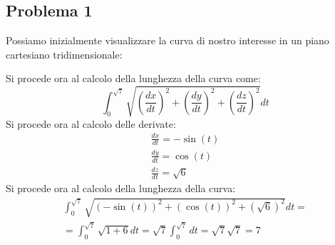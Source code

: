 
\subsection{Problema 1}
Possiamo inizialmente visualizzare la curva di nostro interesse in un piano cartesiano tridimensionale:
\begin{center}

\end{center}

\noindent Si procede ora al calcolo della lunghezza della curva come:
\begin{equation}
    \int_{0}^{\sqrt{7}} \sqrt{\left(\frac{dx}{dt}\right)^2 + \left(\frac{dy}{dt}\right)^2 + \left(\frac{dz}{dt}\right)^2} dt
\end{equation}
Si procede ora al calcolo delle derivate:
\begin{equation}
    \begin{split}
        \frac{dx}{dt} = -\sin(t) \\
        \frac{dy}{dt} = \cos(t)  \\
        \frac{dz}{dt} = \sqrt{6}
    \end{split}
\end{equation}
Si procede ora al calcolo della lunghezza della curva:
\begin{equation}
    \begin{split}
        \int_{0}^{\sqrt{7}} \sqrt{(-\sin(t))^2 + (\cos(t))^2 + (\sqrt{6})^2} dt = \\
        = \int_{0}^{\sqrt{7}} \sqrt{1 + 6} dt = \sqrt{7} \int_{0}^{\sqrt{7}} dt = \sqrt{7} \sqrt{7} = 7
    \end{split}
\end{equation}